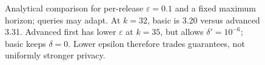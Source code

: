 \begin{figure}[H]
{}
\caption{Analytical comparison for per-release $\varepsilon=0.1$ and a fixed maximum horizon; queries may adapt. At $k=32$, basic is 3.20 versus advanced 3.31. Advanced first has lower $\varepsilon$ at $k=35$, but allows $\delta'=10^{-6}$; basic keeps $\delta=0$. Lower epsilon therefore trades guarantees, not uniformly stronger privacy.}
\label{fig:sealed-composition-crossover}
\end{figure}
